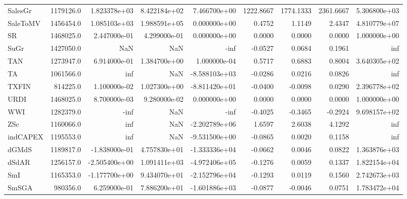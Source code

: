 \begin{tabular}{lrrrrrrrr}
SalesGr   &  1179126.0 &  1.823378e+03 &  8.422184e+02 &  7.466700e+00 &  1222.8667 &  1774.1333 &  2361.6667 &  5.306800e+03 \\
SaleToMV  &  1456454.0 &  1.085103e+03 &  1.988591e+05 &  0.000000e+00 &     0.4752 &     1.1149 &     2.4347 &  4.810779e+07 \\
SR        &  1468025.0 &  2.447000e-01 &  4.299000e-01 &  0.000000e+00 &     0.0000 &     0.0000 &     0.0000 &  1.000000e+00 \\
SuGr      &  1427050.0 &           NaN &           NaN &          -inf &    -0.0527 &     0.0684 &     0.1961 &           inf \\
TAN       &  1273947.0 &  6.914000e-01 &  1.384700e+00 &  1.000000e-04 &     0.5717 &     0.6883 &     0.8004 &  3.640305e+02 \\
TA        &  1061566.0 &           inf &           NaN & -8.588103e+03 &    -0.0286 &     0.0216 &     0.0826 &           inf \\
TXFIN     &   814225.0 &  1.100000e-02 &  1.027300e+00 & -8.811420e+01 &    -0.0400 &    -0.0098 &     0.0290 &  2.396778e+02 \\
URDI      &  1468025.0 &  8.700000e-03 &  9.280000e-02 &  0.000000e+00 &     0.0000 &     0.0000 &     0.0000 &  1.000000e+00 \\
WWI       &  1282379.0 &          -inf &           NaN &          -inf &    -0.4025 &    -0.3465 &    -0.2924 &  9.698157e+02 \\
ZSc       &  1160066.0 &           inf &           NaN & -2.202789e+06 &     1.6597 &     2.6038 &     4.1292 &           inf \\
indCAPEX  &  1195553.0 &           inf &           NaN & -9.531500e+00 &    -0.0865 &     0.0020 &     0.1158 &           inf \\
dGMdS     &  1189817.0 & -1.838000e-01 &  4.757830e+01 & -1.333336e+04 &    -0.0662 &     0.0046 &     0.0822 &  1.363876e+03 \\
dSdAR     &  1256157.0 & -2.505400e+00 &  1.091411e+03 & -4.972406e+05 &    -0.1276 &     0.0059 &     0.1337 &  1.822154e+04 \\
SmI       &  1165353.0 & -1.177700e+00 &  9.434070e+01 & -2.152796e+04 &    -0.1293 &     0.0119 &     0.1560 &  2.742673e+03 \\
SmSGA     &   980356.0 &  6.259000e-01 &  7.886200e+01 & -1.601886e+03 &    -0.0877 &    -0.0046 &     0.0751 &  1.783472e+04 \\
\bottomrule
\end{tabular}
